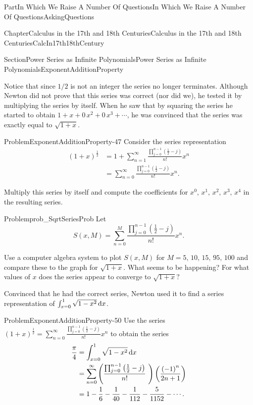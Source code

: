 \documentclass[oneside,10pt,]{book}
\numberwithin{equation}{part}
\newcommand{\dx}[1]{\,{\rm d}#1}
\newcommand{\amp}{&}
\begin{document}
\begin{partptx}{Part}{In Which We Raise A Number Of Questions}{}{In Which We Raise A Number Of Questions}{}{}{AskingQuestions}
\begin{chapterptx}{Chapter}{Calculus in the 17th and 18th Centuries}{}{Calculus in the 17th and 18th Centuries}{}{}{CalcIn17th18thCentury}
\begin{sectionptx}{Section}{Power Series as Infinite Polynomials}{}{Power Series as Infinite Polynomials}{}{}{ExponentAdditionProperty}
%
\par
Notice that since \(1/2\) is not an integer the series no longer terminates.  Although Newton did not prove that this series was correct (nor did we), he tested it by multiplying the series by itself.  When he saw that by squaring the series he started to obtain \(1+x+0\,x^2+0\,x^3+\cdots\), he was convinced that the series was exactly equal to \(\sqrt{1+x}\).%
\begin{problem}{Problem}{}{ExponentAdditionProperty-47}%
Consider the series representation%
\begin{align*}
\left(1+x\right)^{\frac{1}{2}}\amp =1+\sum_{n=1}^\infty\frac{\prod_{j=0}^{n-1}\left(\frac{1}{2}-j\right)}{n!}x^n\\
\amp  =\sum_{n=0}^\infty\frac{\prod_{j=0}^{n-1}\left(\frac{1}{2}-j\right)}{n!}x^n\text{.}
\end{align*}
%
\par
Multiply this series by itself and compute the coefficients for \(x^0,\,x^1,\,x^2,\,x^3,\,x^4\) in the resulting series.%
\end{problem}
\begin{problem}{Problem}{}{prob_SqrtSeriesProb}%
Let%
\begin{equation*}
S(x,M)=\sum_{n=0}^M\frac{\prod_{j=0}^{n-1}\left(\frac{1}{2}-j \right)}{n!}x^n\text{.}
\end{equation*}
%
\par
Use a computer algebra system to plot \(S(x,M)\) for \(M=5,\,10,\,15,\,95,\,100\) and compare these to the graph for \(\sqrt{1+x}\).  What seems to be happening?  For what values of \(x\) does the series appear to converge to \(\sqrt{1+x}?\)%
\end{problem}
Convinced that he had the correct series, Newton used it to find a series representation of \(\int_{x=0}^1\sqrt{1-x^2}
\dx{ x}\).%
\begin{problem}{Problem}{}{ExponentAdditionProperty-50}%
Use the series \(\displaystyle
\left(1+x\right)^{\frac{1}{2}}=\sum_{n=0}^\infty\frac{\prod_{j=0}^{n-1}\left(\frac{1}{2}-j\right)}{n!}x^n\) to obtain the series%
\begin{align*}
\frac{\pi}{4}\amp =\int_{x=0}^1\sqrt{1-x^2} \dx{ x}\\
\amp =\sum_{n=0}^\infty\left(\frac{\prod_{j=0}^{n-1}\left(\frac{1}{2}-j\right)}{n!}\text{ } \right)\left(\frac{\left(-1\right)^n}{2n+1}\right)\\
\amp =1-\frac{1}{6}-\frac{1}{40}-\frac{1}{112}-\frac{5}{1152}-\cdots\text{.}
\end{align*}

\end{problem}
\end{sectionptx}
\end{chapterptx}
\end{partptx}
\end{document}
